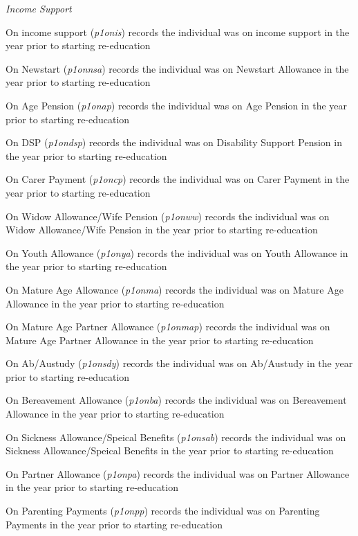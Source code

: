 \documentclass[12pt, a4paper]{article}
\begin{document}
\emph{Income Support}

On income support (\textit{p1\textunderscore{}onis}) records the individual was on income support in the year prior to starting re-education

On Newstart (\textit{p1\textunderscore{}onnsa}) records the individual was on Newstart Allowance in the year prior to starting re-education

On Age Pension (\textit{p1\textunderscore{}onap}) records the individual was on Age Pension in the year prior to starting re-education

On DSP (\textit{p1\textunderscore{}ondsp}) records the individual was on Disability Support Pension in the year prior to starting re-education

On Carer Payment (\textit{p1\textunderscore{}oncp}) records the individual was on Carer Payment in the year prior to starting re-education

On Widow Allowance/Wife Pension (\textit{p1\textunderscore{}onww}) records the individual was on Widow Allowance/Wife Pension in the year prior to starting re-education

On Youth Allowance (\textit{p1\textunderscore{}onya}) records the individual was on Youth Allowance in the year prior to starting re-education

On Mature Age Allowance (\textit{p1\textunderscore{}onma}) records the individual was on Mature Age Allowance in the year prior to starting re-education

On Mature Age Partner Allowance (\textit{p1\textunderscore{}onmap}) records the individual was on Mature Age Partner Allowance in the year prior to starting re-education

On Ab/Austudy (\textit{p1\textunderscore{}onsdy}) records the individual was on Ab/Austudy in the year prior to starting re-education

On Bereavement Allowance (\textit{p1\textunderscore{}onba}) records the individual was on Bereavement Allowance in the year prior to starting re-education

On Sickness Allowance/Speical Benefits (\textit{p1\textunderscore{}onsab}) records the individual was on Sickness Allowance/Speical Benefits in the year prior to starting re-education

On Partner Allowance (\textit{p1\textunderscore{}onpa}) records the individual was on Partner Allowance in the year prior to starting re-education

On Parenting Payments (\textit{p1\textunderscore{}onpp}) records the individual was on Parenting Payments in the year prior to starting re-education
\end{document}
